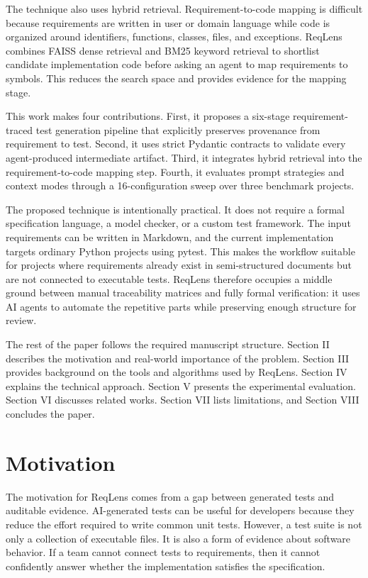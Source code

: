 \documentclass[conference]{IEEEtran}
\begin{document}
The technique also uses hybrid retrieval. Requirement-to-code mapping is
difficult because requirements are written in user or domain language while
code is organized around identifiers, functions, classes, files, and exceptions.
ReqLens combines FAISS dense retrieval and BM25 keyword retrieval to shortlist
candidate implementation code before asking an agent to map requirements to
symbols. This reduces the search space and provides evidence for the mapping
stage.

This work makes four contributions. First, it proposes a six-stage
requirement-traced test generation pipeline that explicitly preserves
provenance from requirement to test. Second, it uses strict Pydantic contracts
to validate every agent-produced intermediate artifact. Third, it integrates
hybrid retrieval into the requirement-to-code mapping step. Fourth, it
evaluates prompt strategies and context modes through a 16-configuration sweep
over three benchmark projects.

The proposed technique is intentionally practical. It does not require a formal
specification language, a model checker, or a custom test framework. The input
requirements can be written in Markdown, and the current implementation targets
ordinary Python projects using pytest. This makes the workflow suitable for
projects where requirements already exist in semi-structured documents but are
not connected to executable tests. ReqLens therefore occupies a middle ground
between manual traceability matrices and fully formal verification: it uses AI
agents to automate the repetitive parts while preserving enough structure for
review.

The rest of the paper follows the required manuscript structure. Section II
describes the motivation and real-world importance of the problem. Section III
provides background on the tools and algorithms used by ReqLens. Section IV
explains the technical approach. Section V presents the experimental
evaluation. Section VI discusses related works. Section VII lists limitations,
and Section VIII concludes the paper.

\section{Motivation}
The motivation for ReqLens comes from a gap between generated tests and
auditable evidence. AI-generated tests can be useful for developers because
they reduce the effort required to write common unit tests. However, a test
suite is not only a collection of executable files. It is also a form of
evidence about software behavior. If a team cannot connect tests to
requirements, then it cannot confidently answer whether the implementation
satisfies the specification.
\end{document}
